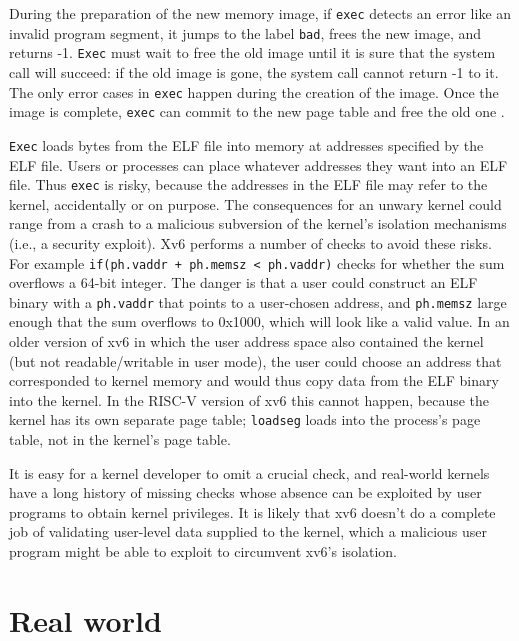 During the preparation of the new memory image,
if
\lstinline{exec}
detects an error like an invalid program segment,
it jumps to the label
\lstinline{bad},
frees the new image,
and returns -1.
\lstinline{Exec}
must wait to free the old image until it
is sure that the system call will succeed:
if the old image is gone,
the system call cannot return -1 to it.
The only error cases in
\lstinline{exec}
happen during the creation of the image.
Once the image is complete,
\lstinline{exec}
can commit to the new page table
and free the old one
.

\lstinline{Exec}
loads bytes from the ELF file into memory at addresses specified by the ELF file.
Users or processes can place whatever addresses they want into an ELF file.
Thus
\lstinline{exec}
is risky, because the addresses in the ELF file may refer to the kernel, accidentally
or on purpose. The consequences for an unwary kernel could range from
a crash to a malicious subversion of the kernel's isolation mechanisms
(i.e., a security exploit).
Xv6 performs a number of checks to avoid these risks.
For example
\lstinline{if(ph.vaddr + ph.memsz < ph.vaddr)}
checks for whether the sum overflows a 64-bit integer.
The danger is that a user could construct an ELF binary with a
\lstinline{ph.vaddr}
that points to a user-chosen address,
and
\lstinline{ph.memsz}
large enough that the sum overflows to 0x1000, which will look like a
valid value. In an older version of xv6 in which the user address
space also contained the kernel (but not readable/writable in user
mode), the user could choose an address that corresponded to kernel
memory and would thus copy data from the ELF binary into the kernel.
In the RISC-V version of xv6 this cannot happen, because the kernel has
its own separate page table;
\lstinline{loadseg}
loads into the process's page table, not in the kernel's page table.

It is easy for a kernel developer to omit a crucial check, and
real-world kernels have a long history of missing checks whose absence
can be exploited by user programs to obtain kernel privileges.  It is likely that xv6 doesn't do a complete job of validating
user-level data supplied to the kernel, which a malicious user program might be able to exploit to circumvent xv6's isolation.
\section{Real world}

